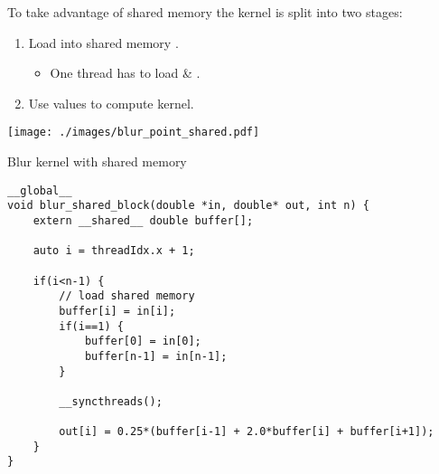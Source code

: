 \documentclass[aspectratio=43]{beamer}
\begin{document}
\begin{frame}[fragile]{}
    To take advantage of shared memory the kernel is split into two stages:
    \begin{enumerate}
        \item Load  into shared memory .
        \begin{itemize}
            \item One thread has to load  \& .
        \end{itemize}
        \item Use values  to compute kernel.
    \end{enumerate}

    \begin{center}
        \texttt{[image: ./images/blur\_point\_shared.pdf]}
    \end{center}
\end{frame}

\begin{frame}[fragile]{}
    \begin{code}{Blur kernel with shared memory}
        \begin{lstlisting}[style=boxcudatiny]
__global__
void blur_shared_block(double *in, double* out, int n) {
    extern __shared__ double buffer[];

    auto i = threadIdx.x + 1;

    if(i<n-1) {
        // load shared memory
        buffer[i] = in[i];
        if(i==1) {
            buffer[0] = in[0];
            buffer[n-1] = in[n-1];
        }

        __syncthreads();

        out[i] = 0.25*(buffer[i-1] + 2.0*buffer[i] + buffer[i+1]);
    }
}
        \end{lstlisting}
    \end{code}

\end{frame}
\end{document}
